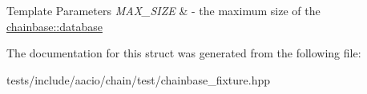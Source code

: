 \begin{DoxyTemplParams}{Template Parameters}
{\em M\+A\+X\+\_\+\+S\+I\+ZE} & -\/ the maximum size of the \mbox{\hyperlink{classchainbase_1_1database}{chainbase\+::database}} \\
\hline
\end{DoxyTemplParams}


The documentation for this struct was generated from the following file\+:\begin{DoxyCompactItemize}
\item 
tests/include/aacio/chain/test/chainbase\+\_\+fixture.\+hpp\end{DoxyCompactItemize}
